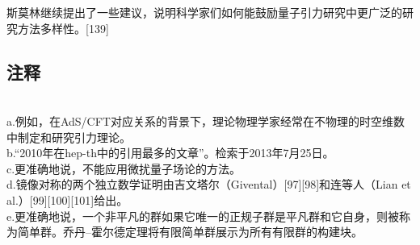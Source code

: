 斯莫林继续提出了一些建议，说明科学家们如何能鼓励量子引力研究中更广泛的研究方法多样性。[139]
\subsection{注释}\\ 
a.例如，在AdS/CFT对应关系的背景下，理论物理学家经常在不物理的时空维数中制定和研究引力理论。\\  
b.“2010年在hep-th中的引用最多的文章”。检索于2013年7月25日。\\ 
c.更准确地说，不能应用微扰量子场论的方法。\\ 
d.镜像对称的两个独立数学证明由吉文塔尔（Givental）[97][98]和连等人（Lian et al.）[99][100][101]给出。\\  
e.更准确地说，一个非平凡的群如果它唯一的正规子群是平凡群和它自身，则被称为简单群。乔丹–霍尔德定理将有限简单群展示为所有有限群的构建块。

